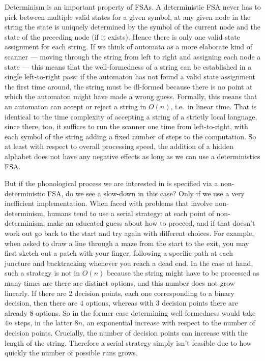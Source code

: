 Determinism is an important property of FSAs.
A deterministic FSA never has to pick between multiple valid states for a given symbol, at any given node in the string the state is uniquely determined by the symbol of the current node and the state of the preceding node (if it exists).
Hence there is only one valid state assignment for each string.
If we think of automata as a more elaborate kind of scanner --- moving through the string from left to right and assigning each node a state --- this means that the well-formedness of a string can be established in a single left-to-right pass: if the automaton has not found a valid state assignment the first time around, the string must be ill-formed because there is no point at which the automaton might have made a wrong guess.
Formally, this means that an automaton can accept or reject a string in $O(n)$, i.e.\ in linear time.
That is identical to the time complexity of accepting a string of a strictly local language, since there, too, it suffices to run the scanner one time from left-to-right, with each symbol of the string adding a fixed number of steps to the computation.
So at least with respect to overall processing speed, the addition of a hidden alphabet does not have any negative effects as long as we can use a deterministics FSA\@.

But if the phonological process we are interested in is specified via a non-deterministic FSA, do we see a slow-down in this case?
Only if we use a very inefficient implementation.
When faced with problems that involve non-determinism, humans tend to use a serial strategy: at each point of non-determinism, make an educated guess about how to proceed, and if that doesn't work out go back to the start and try again with different choices.
For example, when asked to draw a line through a maze from the start to the exit, you may first sketch out a patch with your finger, following a specific path at each juncture and backtracking whenever you reach a dead end.
In the case at hand, such a strategy is not in $O(n)$ because the string might have to be processed as many times are there are distinct options, and this number does not grow linearly.
If there are $2$ decision points, each one corresponding to a binary decision, then there are $4$ options, whereas with $3$ decision points there are already $8$ options.
So in the former case determining well-formedness would take $4n$ steps, in the latter $8n$, an exponential increase with respect to the number of decision points.
Crucially, the number of decision points can increase with the length of the string.
Therefore a serial strategy simply isn't feasible due to how quickly the number of possible runs grows.

